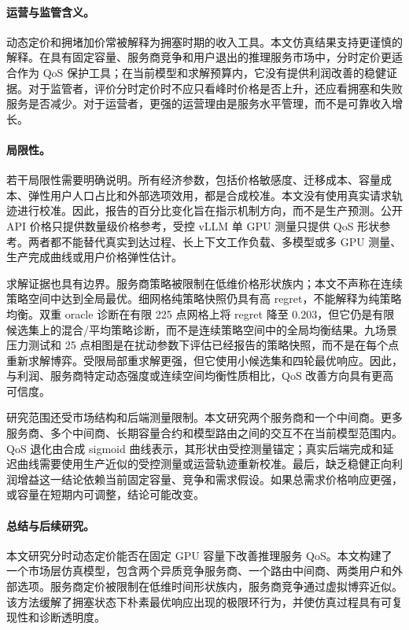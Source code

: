 \documentclass[UTF8,11pt,a4paper]{ctexart}
\begin{document}
\paragraph{运营与监管含义。}

动态定价和拥堵加价常被解释为拥塞时期的收入工具。本文仿真结果支持更谨慎的解释。在具有固定容量、服务商竞争和用户退出的推理服务市场中，分时定价更适合作为 QoS 保护工具；在当前模型和求解预算内，它没有提供利润改善的稳健证据。对于监管者，评价分时定价时不应只看峰时价格是否上升，还应看拥塞和失败服务是否减少。对于运营者，更强的运营理由是服务水平管理，而不是可靠收入增长。

\paragraph{局限性。}
\label{sec:limitations}

若干局限性需要明确说明。所有经济参数，包括价格敏感度、迁移成本、容量成本、弹性用户人口占比和外部选项效用，都是合成校准。本文没有使用真实请求轨迹进行校准。因此，报告的百分比变化旨在指示机制方向，而不是生产预测。公开 API 价格只提供数量级价格参考，受控 vLLM 单 GPU 测量只提供 QoS 形状参考。两者都不能替代真实到达过程、长上下文工作负载、多模型或多 GPU 测量、生产完成曲线或用户价格弹性估计。

求解证据也具有边界。服务商策略被限制在低维价格形状族内；本文不声称在连续策略空间中达到全局最优。细网格纯策略快照仍具有高 regret，不能解释为纯策略均衡。双重 oracle 诊断在有限 225 点网格上将 regret 降至 $0.203$，但它仍是有限候选集上的混合/平均策略诊断，而不是连续策略空间中的全局均衡结果。九场景压力测试和 25 点相图是在扰动参数下评估已经报告的策略快照，而不是在每个点重新求解博弈。受限局部重求解更强，但它使用小候选集和四轮最优响应。因此，与利润、服务商特定动态强度或连续空间均衡性质相比，QoS 改善方向具有更高可信度。

研究范围还受市场结构和后端测量限制。本文研究两个服务商和一个中间商。更多服务商、多个中间商、长期容量合约和模型路由之间的交互不在当前模型范围内。QoS 退化由合成 sigmoid 曲线表示，其形状由受控测量锚定；真实后端完成和延迟曲线需要使用生产近似的受控测量或运营轨迹重新校准。最后，缺乏稳健正向利润增益这一结论依赖当前固定容量、竞争和需求假设。如果总需求价格响应更强，或容量在短期内可调整，结论可能改变。

\paragraph{总结与后续研究。}

本文研究分时动态定价能否在固定 GPU 容量下改善推理服务 QoS。本文构建了一个市场层仿真模型，包含两个异质竞争服务商、一个路由中间商、两类用户和外部选项。服务商定价被限制在低维时间形状族内，服务商竞争通过虚拟博弈近似。该方法缓解了拥塞状态下朴素最优响应出现的极限环行为，并使仿真过程具有可复现性和诊断透明度。
\end{document}
